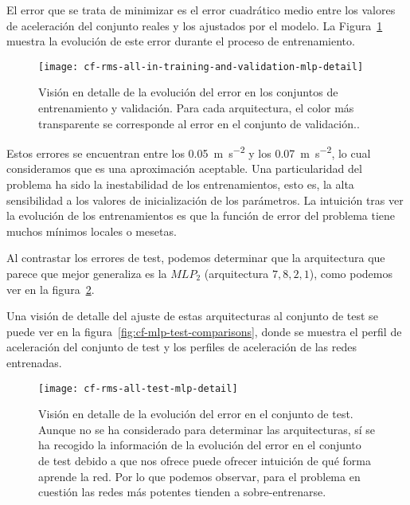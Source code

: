 El error que se trata de minimizar es el error cuadrático medio entre los valores de aceleración del conjunto reales y los ajustados por el modelo. La Figura~\ref{fig:cf-rms-all-in-training-and-validation-mlp-detail} muestra la evolución de este error durante el proceso de entrenamiento.

\begin{figure}
	\centering
	\texttt{[image: cf-rms-all-in-training-and-validation-mlp-detail]}
	\caption[Evolución del error en entrenamiento en los \ac{mlp} para las arquitecturas seleccionadas]{Visión en detalle de la evolución del error en los conjuntos de entrenamiento y validación. Para cada arquitectura, el color más transparente se corresponde al error en el conjunto de validación..}
	\label{fig:cf-rms-all-in-training-and-validation-mlp-detail}
\end{figure}

Estos errores se encuentran entre los \SI{0.05}{\metre\per\square\second} y los \SI{0.07}{\metre\per\square\second}, lo cual consideramos que es una aproximación aceptable. Una particularidad del problema ha sido la inestabilidad de los entrenamientos, esto es, la alta sensibilidad a los valores de inicialización de los parámetros. La intuición tras ver la evolución de los entrenamientos es que la función de error del problema tiene muchos mínimos locales o mesetas.

Al contrastar los errores de test, podemos determinar que la arquitectura que parece que mejor generaliza es la $MLP_2$ (arquitectura $7, 8, 2, 1$), como podemos ver en la figura~\ref{fig:cf-rms-all-test-mlp-detail}.

Una visión de detalle del ajuste de estas arquitecturas al conjunto de test se puede ver en la figura~\ref{fig:cf-mlp-test-comparisons}, donde se muestra el perfil de aceleración del conjunto de test y los perfiles de aceleración de las redes entrenadas.

\begin{figure}
	\centering
	\texttt{[image: cf-rms-all-test-mlp-detail]}
	\caption[Evolución del error en el conjunto de test durante el entrenamiento]{Visión en detalle de la evolución del error en el conjunto de test. Aunque no se ha considerado para determinar las arquitecturas, sí se ha recogido la información de la evolución del error en el conjunto de test debido a que nos ofrece puede ofrecer intuición de qué forma aprende la red. Por lo que podemos observar, para el problema en cuestión las redes más potentes tienden a sobre-entrenarse.}
	\label{fig:cf-rms-all-test-mlp-detail}
\end{figure}

